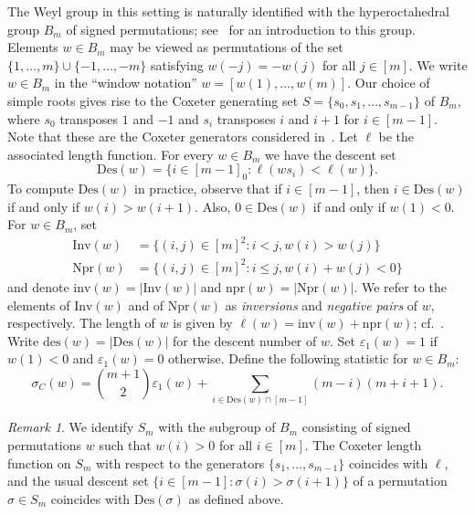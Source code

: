 \documentclass[11pt,a4paper]{amsart}
\theoremstyle{plain}
\theoremstyle{remark}
\newtheorem{rem}[thm]{Remark}
\begin{document}
The Weyl group in this setting is naturally identified with the hyperoctahedral group $B_m$ of signed permutations; see~\cite[Section~8.1]{BjoernerBrenti/05} for an introduction to this group.  Elements $w \in B_m$ may be viewed as permutations of the set $\{ 1, \dots, m \} \cup \{ -1, \dots, -m \}$ satisfying $w(-j) = -w(j)$ for all $j \in [m]$.  We write $w \in B_m$ in the ``window notation'' $w = [w(1), \dots, w(m)]$.  Our choice of simple roots gives rise to the Coxeter generating set $S = \{s_0, s_1, \dots, s_{m-1} \}$ of $B_m$, where $s_0$ transposes $1$ and $-1$ and $s_i$ transposes $i$ and $i+1$ for $i \in [m-1]$.  Note that these are the Coxeter generators considered in~\cite{BjoernerBrenti/05}.  Let $\ell$ be the associated length function.  For every $w \in B_m$ we have the descent set
$$ \mathrm{Des}(w) = \{ i \in [m-1]_0 : \ell(w s_i) < \ell(w) \}.$$
To compute $\mathrm{Des}(w)$ in practice, observe that if $i \in [m-1]$, then $i \in \mathrm{Des}(w)$ if and only if $w(i) > w(i + 1)$.  Also, $0 \in \mathrm{Des}(w)$ if and only if $w(1) < 0$.  For $w \in B_m$, set
\begin{align*}
\mathrm{Inv}(w) & =  \{ (i,j) \in [m]^2 : i < j , w(i) > w(j) \} \\
\mathrm{Npr}(w) & =  \{ (i,j) \in [m]^2 : i \leq j , w(i) + w(j) < 0 \}
\end{align*}
and denote $\mathrm{inv}(w) = | \mathrm{Inv}(w) |$ and $\mathrm{npr}(w) = | \mathrm{Npr}(w) |$.  We refer to the elements of $\mathrm{Inv}(w)$ and of $\mathrm{Npr}(w)$ as {\emph{inversions}} and {\emph{negative pairs}} of $w$, respectively.  The length of $w$ is given by $\ell (w) = \mathrm{inv}(w) + \mathrm{npr}(w)$; cf.~\cite[Proposition~8.1.1]{BjoernerBrenti/05}.  Write $\mathrm{des}(w) = | \mathrm{Des}(w) |$ for the descent number of $w$.  Set $\varepsilon_1(w) = 1$ if $w(1) < 0$ and $\varepsilon_1(w) = 0$ otherwise.  Define the following statistic for $w \in B_m$:
$$ \sigma_C(w) = \binom{m+1}{2} \varepsilon_1(w) + \sum_{i \in \mathrm{Des}(w) \cap [m-1]} (m-i)(m+i+1).$$

\begin{rem} \label{rmk:permutation.descent}
We identify $S_m$ with the subgroup of $B_m$ consisting of signed permutations $w$ such that $w(i) > 0$ for all $i \in [m]$.  The Coxeter length function on $S_m$ with respect to the generators $\{ s_1, \dots, s_{m-1} \}$ coincides with $\ell$, and the usual descent set $\{ i \in [m-1] : \sigma(i) > \sigma(i+1) \}$ of a permutation $\sigma \in S_m$ coincides with $\mathrm{Des}(\sigma)$ as defined above.  
\end{rem}
\end{document}
